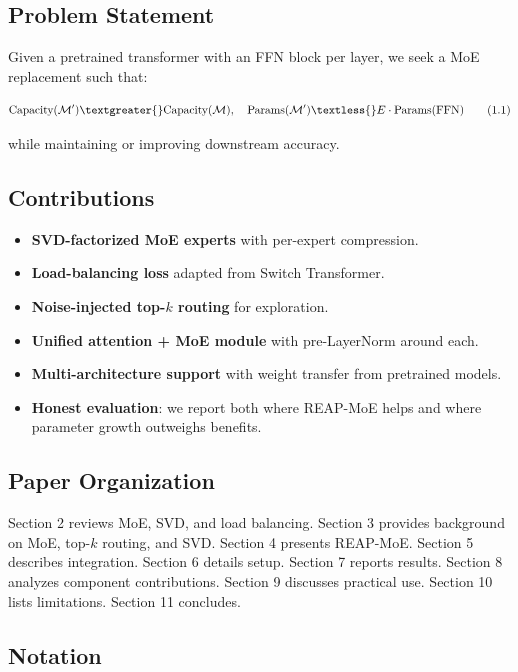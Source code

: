 \subsection{Problem Statement}

Given a pretrained transformer with an FFN block per layer, we seek a MoE 
replacement such that:

\[
\text{Capacity}(\mathcal{M}') \textgreater{} \text{Capacity}(\mathcal{M}), \quad
\text{Params}(\mathcal{M}') \textless{} E \cdot \text{Params}(\text{FFN})
\tag{1.1}
\]

while maintaining or improving downstream accuracy.

\subsection{Contributions}

\begin{itemize}
\item \textbf{SVD-factorized MoE experts} with per-expert compression.
\item \textbf{Load-balancing loss} adapted from Switch Transformer.
\item \textbf{Noise-injected top-$k$ routing} for exploration.
\item \textbf{Unified attention + MoE module} with pre-LayerNorm around each.
\item \textbf{Multi-architecture support} with weight transfer from pretrained models.
\item \textbf{Honest evaluation}: we report both where REAP-MoE helps and where
  parameter growth outweighs benefits.

\end{itemize}
\subsection{Paper Organization}

Section 2 reviews MoE, SVD, and load balancing. Section 3 provides background 
on MoE, top-$k$ routing, and SVD. Section 4 presents REAP-MoE. Section 5 
describes integration. Section 6 details setup. Section 7 reports results. 
Section 8 analyzes component contributions. Section 9 discusses practical 
use. Section 10 lists limitations. Section 11 concludes.



\subsection{Notation}

